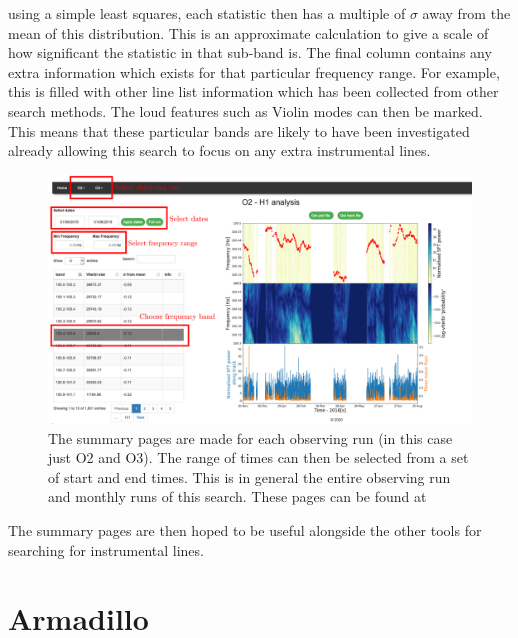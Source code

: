 using a simple least squares, each statistic then has a multiple of $\sigma$
away from the mean of this distribution.  This is an approximate calculation to
give a scale of how significant the statistic in that sub-band is.  The final
column contains any extra information which exists for that particular
frequency range.  For example, this is filled with other line list information
which has been collected from other search methods.  The loud features such as
Violin modes can then be marked. This means that these particular bands are
likely to have been investigated already allowing this search to focus on any
extra instrumental lines.~



\begin{figure}
	\centering
	\includegraphics[width=\textwidth]{C6_detchar/summary_annot.pdf}
	\caption[Example summary page for SOAP search]{The summary pages are made for each observing run (in this case just O2 and O3). The range of times can then be selected from a set of start and end times. This is in general the entire observing run and monthly runs of this search. These pages can be found at \citep{bayleyHome}}
	\label{detchar:summary:plots}
\end{figure}

The summary pages are then hoped to be useful alongside the other tools for
searching for instrumental lines. ~


\clearpage

\section{Armadillo}

